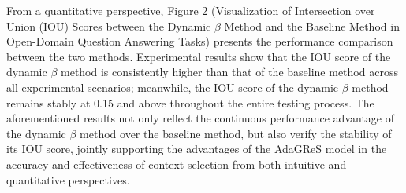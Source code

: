 \documentclass[11pt]{article}
\begin{document}
From a quantitative perspective, Figure 2 (Visualization of Intersection over Union (IOU) Scores between the Dynamic $\beta$ Method and the Baseline Method in Open-Domain Question Answering Tasks) presents the performance comparison between the two methods. Experimental results show that the IOU score of the dynamic $\beta$ method is consistently higher than that of the baseline method across all experimental scenarios; meanwhile, the IOU score of the dynamic $\beta$ method remains stably at 0.15 and above throughout the entire testing process. The aforementioned results not only reflect the continuous performance advantage of the dynamic $\beta$ method over the baseline method, but also verify the stability of its IOU score, jointly supporting the advantages of the AdaGReS model in the accuracy and effectiveness of context selection from both intuitive and quantitative perspectives.
\end{document}
